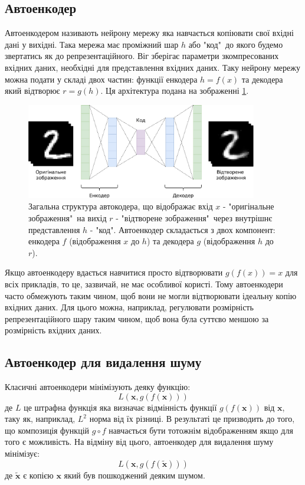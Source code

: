 \documentclass[14pt,a4paper]{extarticle}
\newcounter{e}
\numberwithin{equation}{section}
\numberwithin{figure}{section}
\begin{document}
	\subsection{Автоенкодер}
	
	Автоенкодером називають нейрону мережу яка навчається копіювати свої вхідні дані у вихідні. Така мережа має проміжний шар $h$ або "код"\, до якого будемо звертатись як до репрезентаційного. Віг зберігає параметри зкомпресованих вхідних даних, необхідні для представлення вхідних даних. Таку нейрону мережу можна подати у складі двох частин: функції енкодера $h = f(x)$ та декодера який відтворює $r = g(h)$. Ця архітектура подана на зображенні \ref*{fig:autoencoder-graph}.
	\begin{figure}[H]
		\centering
		\includegraphics[width=0.9\textwidth]{../resources/autoencoder.pdf}
		\caption{Загальна структура автокодера, що відображає вхід $x$ - "оригінальне зображення"\ на вихід $r$ - "відтворене зображення"\ через внутрішнє представлення $h$ - "код". Автоенкодер складається з двох компонент: енкодера $f$ (відображення $x$ до $h$) та декодера $g$ (відображення $h$ до $r$).}
		\label{fig:autoencoder-graph}
	\end{figure}
	Якщо автоенкодеру вдається навчитися просто відтворювати $g(f(x)) = x$ для всіх прикладів, то це, зазвичай, не має особливої користі. Тому автоенкодери часто обмежують таким чином, щоб вони не могли відтворювати ідеальну копію вхідних даних. Для цього можна, наприклад, регулювати розмірність репрезентаційного шару таким чином, щоб вона була суттєво меншою за розмірність вхідних даних.
	
	\newpage
	\subsection{Автоенкодер для видалення шуму}
	Класичні автоенкодери мінімізують деяку функцію:
	\begin{equation}
		L(\boldsymbol{x}, g(f(\boldsymbol{x})))
	\end{equation}
	де $L$ це штрафна функція яка визначає відмінність функції $g(f(\boldsymbol{x}))$ від $\boldsymbol{x}$, таку як, наприклад,  $L^{2}$ норма від їх різниці. В результаті це призводить до того, що композиція функцій $g \circ f$ навчається бути тотожнім відображенням якщо для того є можливість. На відміну від цього, автоенкодер для видалення шуму мінімізує:
	\begin{equation}
		L(\boldsymbol{x}, g(f(\tilde{\boldsymbol{x}})))
	\end{equation}
	де $\tilde{\boldsymbol{x}}$ є копією $\boldsymbol{x}$ який був пошкоджений деяким шумом. 
		
\end{document}

